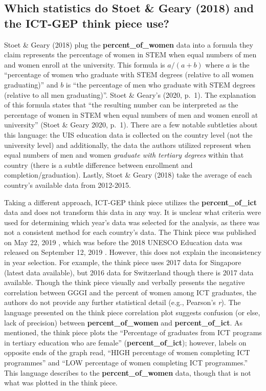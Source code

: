\documentclass[]{book}
\begin{document}
\subsection{Which statistics do Stoet \& Geary (2018) and the ICT-GEP
think piece
use?}\label{which-statistics-do-stoet-geary-2018-and-the-ict-gep-think-piece-use}

Stoet \& Geary (2018) plug the \textbf{percent\_of\_women} data into a
formula they claim represents the percentage of women in STEM when equal
numbers of men and women enroll at the university. This formula is
\(a/(a+b)\) where \(a\) is the ``percentage of women who graduate with
STEM degrees (relative to all women graduating)'' and \(b\) is ``the
percentage of men who graduate with STEM degrees (relative to all men
graduating)''. Stoet \& Geary's (2020, p.~1). The explanation of this
formula states that ``the resulting number can be interpreted as the
percentage of women in STEM when equal numbers of men and women enroll
at university'' (Stoet \& Geary 2020, p.~1). There are a few notable
subtleties about this language: the UIS education data is collected on
the country level (not the university level) and additionally, the data
the authors utilized represent when equal numbers of men and women
\emph{graduate with tertiary degrees} within that country (there is a
subtle difference between enrollment and completion/graduation). Lastly,
Stoet \& Geary (2018) take the average of each country's available data
from 2012-2015.

Taking a different approach, ICT-GEP think piece utilizes the
\textbf{percent\_of\_ict} data and does not transform this data in any
way. It is unclear what criteria were used for determining which year's
data was selected for the analysis, as there was not a consistent method
for each country's data. The Think piece was published on May 22, 2019
\citep{khazanMoreGenderEquality2018}, which was before the 2018 UNESCO
Education data was released on September 12, 2019
\citep{UISEducationData2019}. However, this does not explain the
inconsistency in year selection. For example, the think piece uses 2017
data for Singapore (latest data available), but 2016 data for
Switzerland though there is 2017 data available. Though the think piece
visually and verbally presents the negative correlation between GGGI and
the percent of women among ICT graduates, the authors do not provide any
further statistical detail (e.g., Pearson's \emph{r}). The language
presented on the think piece correlation plot suggests confusion (or
else, lack of precision) between \textbf{percent\_of\_women} and
\textbf{percent\_of\_ict}. As mentioned, the think piece plots the
``Percentage of graduates from ICT programs in tertiary education who
are female'' (\textbf{percent\_of\_ict}); however, labels on opposite
ends of the graph read, ``HIGH percentage of women completing ICT
programmes'' and ``LOW percentage of women completing ICT programmes.''
This language describes to the \textbf{percent\_of\_women} data, though
that is not what was plotted in the think piece.
\end{document}
